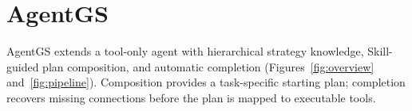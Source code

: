 \section{AgentGS}
\label{sec:method}
AgentGS extends a tool-only agent with hierarchical strategy knowledge, Skill-guided plan composition, and automatic completion (Figures~\ref{fig:overview} and~\ref{fig:pipeline}). Composition provides a task-specific starting plan; completion recovers missing connections before the plan is mapped to executable tools.




